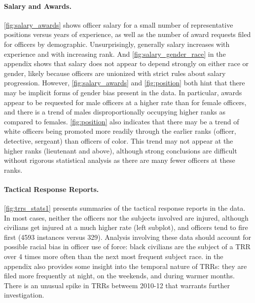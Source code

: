 \paragraph{Salary and Awards.} \cref{fig:salary_awards} shows officer salary for a small number of representative
positions versus years of experience, as well as the number of award requests filed for officers by demographic.
Unsurprisingly, generally salary increases with experience and with increasing rank. 
And \cref{fig:salary_gender_race} in the appendix shows that salary does not appear to depend strongly on either race or gender,
likely because officers are unionized with strict rules about salary progression.
However, \cref{fig:salary_awards} and \cref{fig:position} both hint that there may be implicit forms of gender
bias present in the data. In particular, awards appear to be requested for male officers at a higher rate than for female officers,
and there is a trend of males disproportionally occupying higher ranks as compared to females.
\cref{fig:position} also indicates that there may be a trend of white officers being promoted more readily 
through the earlier ranks (officer, detective, sergeant) than officers of color.
This trend may not appear at the higher ranks (lieutenant and above), although strong conclusions are difficult without 
rigorous statistical analysis as there are many fewer officers at these ranks.

\paragraph{Tactical Response Reports.}
\cref{fig:trrs_stats1} presents summaries of the tactical response reports in the data.
 In most cases, neither the officers nor the
subjects involved are injured, although civilians get injured at a much higher
rate (left subplot), and officers tend to fire first (4593 instances versus 329).
Analysis involving these data should account for possible racial bias in officer use of force: 
black civilians are the subject of a TRR over 4 times more often than the next 
most frequent subject race. 
 in the appendix also provides some 
insight into the temporal nature of TRRs: they are filed more frequently 
at night, on the weekends, and during warmer months. 
There is an unusual spike in TRRs betweem 2010-12 that warrants further investigation.





